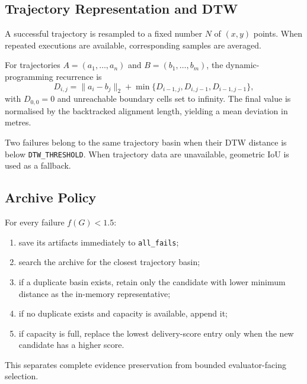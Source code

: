 \documentclass[11pt,a4paper,openany]{report}
\newcommand{\code}[1]{\texttt{#1}}
\begin{document}
\subsection{Trajectory Representation and DTW}
A successful trajectory is resampled to a fixed number $N$ of $(x,y)$ points. When repeated executions are available, corresponding samples are averaged.

For trajectories $A=(a_1,\ldots,a_n)$ and $B=(b_1,\ldots,b_m)$, the dynamic-programming recurrence is
\[
D_{i,j}=\lVert a_i-b_j\rVert_2+
\min\{D_{i-1,j},D_{i,j-1},D_{i-1,j-1}\},
\]
with $D_{0,0}=0$ and unreachable boundary cells set to infinity. The final value is normalised by the backtracked alignment length, yielding a mean deviation in metres.

Two failures belong to the same trajectory basin when their DTW distance is below \code{DTW\_THRESHOLD}. When trajectory data are unavailable, geometric IoU is used as a fallback.

\subsection{Archive Policy}
For every failure $f(G)<1.5$:
\begin{enumerate}
  \item save its artifacts immediately to \code{all\_fails};
  \item search the archive for the closest trajectory basin;
  \item if a duplicate basin exists, retain only the candidate with lower minimum distance as the in-memory representative;
  \item if no duplicate exists and capacity is available, append it;
  \item if capacity is full, replace the lowest delivery-score entry only when the new candidate has a higher score.
\end{enumerate}

This separates complete evidence preservation from bounded evaluator-facing selection.
\end{document}
